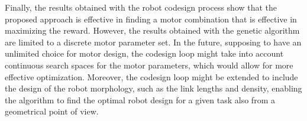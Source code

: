 Finally, the results obtained with the robot codesign process show that the proposed approach is effective in finding a motor combination that is effective in maximizing the reward. However, the results obtained with the genetic algorithm are limited to a discrete motor parameter set. In the future, supposing to have an unlimited choice for motor design, the codesign loop might take into account continuous search spaces for the motor parameters, which would allow for more effective optimization. Moreover, the codesign loop might be extended to include the design of the robot morphology, such as the link lengths and density, enabling the algorithm to find the optimal robot design for a given task also from a geometrical point of view.